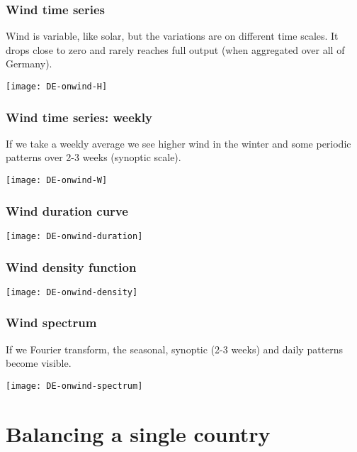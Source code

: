 \documentclass[10pt,aspectratio=169,dvipsnames]{beamer}
\begin{document}
\begin{frame}
  \frametitle{Wind time series}

  Wind is variable, like solar, but the variations are on different time scales. It drops close to zero and rarely reaches full output (when aggregated over all of Germany).

  \centering
  \texttt{[image: DE-onwind-H]}

\end{frame}


\begin{frame}
  \frametitle{Wind time series: weekly}

  If we take a weekly average we see higher wind in the winter and
  some periodic patterns over 2-3 weeks (\alert{synoptic scale}).

  \centering
  \texttt{[image: DE-onwind-W]}

\end{frame}



\begin{frame}
  \frametitle{Wind duration curve}



  \centering
  \texttt{[image: DE-onwind-duration]}

\end{frame}




\begin{frame}
  \frametitle{Wind density function}

  \centering
  \texttt{[image: DE-onwind-density]}

\end{frame}




\begin{frame}
  \frametitle{Wind spectrum}

  If we Fourier transform, the \alert{seasonal}, \alert{synoptic} (2-3 weeks) and \alert{daily} patterns become visible.

  \centering
  \texttt{[image: DE-onwind-spectrum]}

\end{frame}


\section{Balancing a single country}
\end{document}
